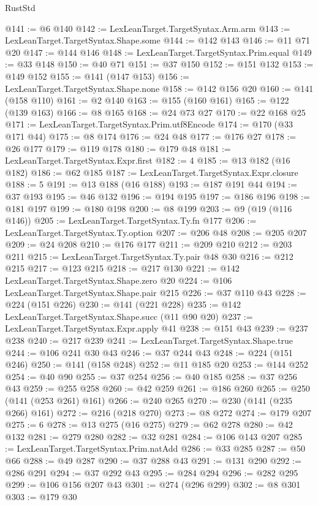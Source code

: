 \begin{lexlean}{RustStd}
\begin{coremodule}
@141 := @6 @140
@142 := LexLeanTarget.TargetSyntax.Arm.arm
@143 := LexLeanTarget.TargetSyntax.Shape.some
@144 := @142 @143
@146 := @11 @71 @20
@147 := @144 @146
@148 := LexLeanTarget.TargetSyntax.Prim.equal
@149 := @33 @148
@150 := @40 @71
@151 := @37 @150
@152 := @151 @132
@153 := @149 @152
@155 := @141 (@147 @153)
@156 := LexLeanTarget.TargetSyntax.Shape.none
@158 := @142 @156 @20
@160 := @141 (@158 @110)
@161 := @2 @140
@163 := @155 (@160 @161)
@165 := @122 (@139 @163)
@166 := @8 @165
@168 := @24 @73 @27
@170 := @22 @168 @25
@171 := LexLeanTarget.TargetSyntax.Prim.utf8Encode
@174 := @170 (@33 @171 @44)
@175 := @8 @174
@176 := @24 @48
@177 := @176 @27
@178 := @26 @177
@179 := @119 @178
@180 := @179 @48
@181 := LexLeanTarget.TargetSyntax.Expr.first
@182 := 4
@185 := @13 @182 (@16 @182)
@186 := @62 @185
@187 := LexLeanTarget.TargetSyntax.Expr.closure
@188 := 5
@191 := @13 @188 (@16 @188)
@193 := @187 @191 @44
@194 := @37 @193
@195 := @46 @132
@196 := @194 @195
@197 := @186 @196
@198 := @181 @197
@199 := @180 @198
@200 := @8 @199
@203 := @9 (@19 (@116 @146))
@205 := LexLeanTarget.TargetSyntax.Ty.fn @177
@206 := LexLeanTarget.TargetSyntax.Ty.option
@207 := @206 @48
@208 := @205 @207
@209 := @24 @208
@210 := @176 @177
@211 := @209 @210
@212 := @203 @211
@215 := LexLeanTarget.TargetSyntax.Ty.pair @48 @30
@216 := @212 @215
@217 := @123 @215
@218 := @217 @130
@221 := @142 LexLeanTarget.TargetSyntax.Shape.zero @20
@224 := @106 LexLeanTarget.TargetSyntax.Shape.pair @215
@226 := @37 @110 @43
@228 := @224 (@151 @226)
@230 := @141 (@221 @228)
@235 := @142 LexLeanTarget.TargetSyntax.Shape.succ (@11 @90 @20)
@237 := LexLeanTarget.TargetSyntax.Expr.apply @41
@238 := @151 @43
@239 := @237 @238
@240 := @217 @239
@241 := LexLeanTarget.TargetSyntax.Shape.true
@244 := @106 @241 @30 @43
@246 := @37 @244 @43
@248 := @224 (@151 @246)
@250 := @141 (@158 @248)
@252 := @11 @185 @20
@253 := @144 @252
@254 := @40 @90
@255 := @37 @254
@256 := @40 @185
@258 := @37 @256 @43
@259 := @255 @258
@260 := @42 @259
@261 := @186 @260
@265 := @250 (@141 (@253 @261) @161)
@266 := @240 @265
@270 := @230 (@141 (@235 @266) @161)
@272 := @216 (@218 @270)
@273 := @8 @272
@274 := @179 @207
@275 := 6
@278 := @13 @275 (@16 @275)
@279 := @62 @278
@280 := @42 @132
@281 := @279 @280
@282 := @32 @281
@284 := @106 @143 @207
@285 := LexLeanTarget.TargetSyntax.Prim.natAdd
@286 := @33 @285
@287 := @50 @66
@288 := @49 @287
@290 := @37 @288 @43
@291 := @131 @290
@292 := @286 @291
@294 := @37 @292 @43
@295 := @284 @294
@296 := @282 @295
@299 := @106 @156 @207 @43
@301 := @274 (@296 @299)
@302 := @8 @301
@303 := @179 @30

\end{coremodule}
\end{lexlean}
